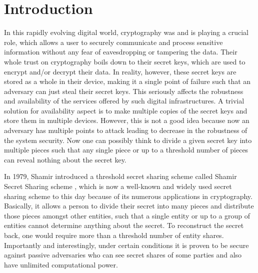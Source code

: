 \chapter{Introduction}
\label{cha:0}

In this rapidly evolving digital world, cryptography was and is playing a crucial role, which 
allows a user to securely communicate and process sensitive information without any 
fear of eavesdropping or tampering the data. Their whole trust on cryptography boils 
down to their secret keys, which are used to encrypt and/or decrypt their data. In 
reality, however, these secret keys are stored as a whole in their device, making it 
a single point of failure such that an adversary can just steal their secret keys. 
This seriously affects the robustness and availability of the services offered by 
such digital infrastructures. A trivial solution for availability aspect is to make 
multiple copies of the secret keys and store them in multiple devices. However, 
this is not a good idea because now an adversary has multiple points to attack leading 
to decrease in the robustness of the system security. Now one can possibly think to 
divide a given secret key into multiple pieces such that any single piece or up to a 
threshold number of pieces can reveal nothing about the secret key.\par 

In 1979, Shamir introduced a threshold secret sharing scheme called 
Shamir Secret Sharing scheme \cite{10.1145/359168.359176}, which is now a well-known 
and widely used secret sharing scheme to this day because of its numerous applications in
cryptography. Basically, it allows a person to divide their secret into many pieces and distribute 
those pieces amongst other entities, such that a single entity or up to a group of 
entities cannot determine anything about the secret. To reconstruct the secret back, 
one would require more than a threshold number of entity shares. Importantly and interestingly, 
under certain conditions it is proven to be 
secure against passive adversaries who can see secret shares of some parties and also have 
unlimited computational power.\par 

